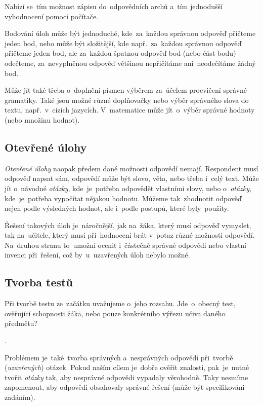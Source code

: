 \documentclass[10pt,a4paper]{article}
\begin{document}
        Nabízí se~tím možnost zápisu do~odpovědních archů a~tím jednodušší vyhodnocení pomocí počítače.

        Bodování úloh může být jednoduché, kde~za~každou správnou odpověď přičteme jeden bod, nebo může být složitější, kde např.~za~každou správnou odpověď přičteme jeden bod, ale za~každou špatnou odpověď bod (nebo část bodu) odečteme, za~nevyplněnou odpověď většinou nepřičítáme ani~neodečítáme žádný bod.

        Může jít také třeba o~doplnění písmen výběrem za~účelem procvičení správné gramatiky. Také jsou možné různé doplňovačky nebo výběr správného slova do textu, např.~v~cizích jazycích. V~matematice může jít~o~výběr správné hodnoty (nebo množinu hodnot).

        \subsection{Otevřené úlohy}
        \emph{Otevřené úlohy} naopak předem dané možnosti odpovědí nemají. Respondent musí odpověď napsat sám, odpovědí může být slovo, věta, nebo třeba i~celý text. Může jít o~návodné \emph{otázky}, kde~je~potřeba odpovědět vlastními slovy, nebo o~\emph{otázky}, kde~je~potřeba vypočítat nějakou hodnotu. Můžeme tak~zhodnotit odpověď nejen podle výsledných hodnot, ale i~podle postupů, které byly~použity.

        Řešení takových úloh je~náročnější, jak na~žáka, který musí odpověď vymyslet, tak na~učitele, který musí při~hodnocení brát v~potaz různé možnosti odpovědí. Na~druhou stranu to~umožní ocenit i~částečně správné odpovědi nebo vlastní invenci při~řešení, což by~u~uzavřených úloh nebylo možné. \cite{rozhlasOUtazky}

        \subsection{Tvorba testů}
        Při tvorbě testu ze~začátku uvažujeme o~jeho rozsahu. Jde~o~obecný test, ověřující schopnosti žáka, nebo pouze konkrétního výřezu učiva daného předmětu?

        . \cite{Suchoradsky:testy}
        
        Problémem je~také~tvorba správných a~nesprávných odpovědí při~tvorbě (\emph{uzavřených}) otázek. Pokud naším cílem je~dobře ověřit znalosti, pak~je~nutné tvořit \emph{otázky} tak, aby nesprávné odpovědi vypadaly věrohodně. Taky nesmíme zapomenout, aby odpovědi obsahovaly správné řešení (může být specifikováni zadáním).
\end{document}
